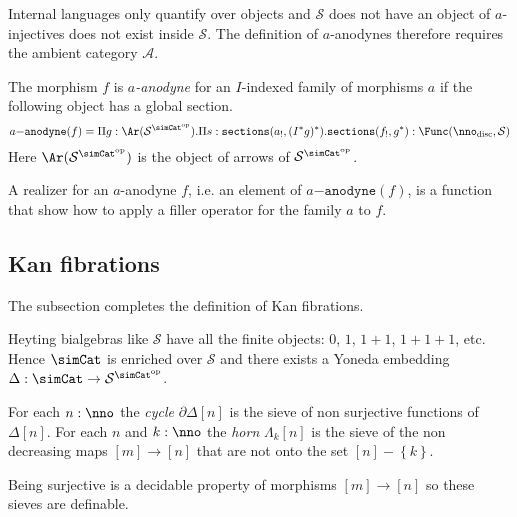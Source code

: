 \documentclass{tac}
\newcommand\hide[1]{}
\newcommand\cat\mathcal
\newcommand\set[1]{\left\{#1\right\}}
\newcommand\ri{^*}
\newcommand\dual{^{\mathrm{op}}}
\newcommand\disc{_{\mathrm{disc}}}
\newcommand\s{^{\simCat\dual}}
\newcommand\of{:}
\newcommand\simplex\Delta
\newcommand\cycle{\partial\Delta}
\newcommand\horn\Lambda
\newcommand\code\mathtt
\begin{document}
\hide{Add?: These injectives satisfy the usual properties of closure under products, composition and pullback, thanks to specific constructions on filler operators.}

Internal languages only quantify over objects and $\cat S$ does not have an object of $a$-injectives does not exist inside $\cat S$. The definition of $a$-anodynes therefore requires the ambient category $\cat A$.

\hide{Figure this out: a map from lifting operators to liftings\dots}
\begin{definition}
The morphism $f$ is \emph{$a$-anodyne} for an $I$-indexed family of morphisms $a$ if the following object has a global section.
\[ a\code{-anodyne}(f) = \Pi g\of \Ar(\cat S\s).\Pi s\of \code{sections}(a_!,(I\ri g)\ri).\code{sections}(f_!,g\ri)\of\Func(\nno\disc,\cat S) \]
Here $\Ar(\cat S\s)$ is the object of arrows of $\cat S\s$.
\end{definition}

A realizer for an $a$-anodyne $f$, i.e. an element of $a\code{-anodyne}(f)$, is a function that show how to apply a filler operator for the family $a$ to $f$.

\subsection{Kan fibrations}
The subsection completes the definition of Kan fibrations.

Heyting bialgebras like $\cat S$ have all the finite objects: $0$, $1$, $1+1$, $1+1+1$, etc. Hence $\simCat$ is enriched over $\cat S$ and there exists a Yoneda embedding $\Delta\of \simCat \to \cat S^{\simCat \dual}$. 

\begin{definition} For each $n\of \nno$ the \emph{cycle} $\cycle[n]$ is the sieve of non surjective functions of $\simplex[n]$. For each $n$ and $k\of\nno$ the \emph{horn} $\horn_k[n]$ is the sieve of the non decreasing maps $[m]\to [n]$ that are not onto the set $[n]-\set{k}$. 
\end{definition}

\hide{formulas for precision?}

Being surjective is a decidable property of morphisms $[m]\to[n]$ so these sieves are definable. 
\end{document}
